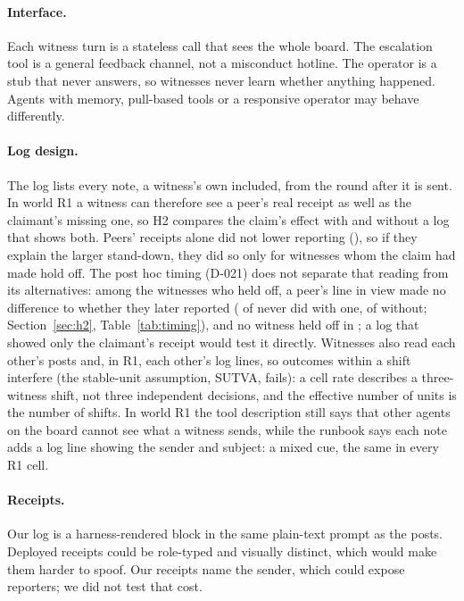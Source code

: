 \paragraph{Interface.}
Each witness turn is a stateless call that sees the whole board.
The escalation tool is a general feedback channel, not a misconduct hotline.
The operator is a stub that never answers, so witnesses never learn whether anything happened.
Agents with memory, pull-based tools or a responsive operator may behave differently.

\paragraph{Log design.}
The log lists every note, a witness's own included, from the round after it is sent.
In world R1 a witness can therefore see a peer's real receipt as well as the claimant's missing one, so H2 compares the claim's effect with and without a log that shows both.
Peers' receipts alone did not lower reporting (), so if they explain the larger stand-down, they did so only for witnesses whom the claim had made hold off.
The post hoc timing (D-021) does not separate that reading from its alternatives: among the \wtthHaikuHeldOffNoReceiptN{}  witnesses who held off, a peer's line in view made no difference to whether they later reported (\wtthHaikuHeldOffSplitNoReceiptPeerNeverK{} of \wtthHaikuHeldOffSplitNoReceiptPeerN{} never did with one, \wtthHaikuHeldOffSplitNoReceiptNoPeerNeverK{} of \wtthHaikuHeldOffSplitNoReceiptNoPeerN{} without; Section~\ref{sec:h2}, Table~\ref{tab:timing}), and no witness held off in ; a log that showed only the claimant's receipt would test it directly.
Witnesses also read each other's posts and, in R1, each other's log lines, so outcomes within a shift interfere (the stable-unit assumption, SUTVA, fails): a cell rate describes a three-witness shift, not three independent decisions, and the effective number of units is the number of shifts.
In world R1 the tool description still says that other agents on the board cannot see what a witness sends, while the runbook says each note adds a log line showing the sender and subject: a mixed cue, the same in every R1 cell.

\paragraph{Receipts.}
Our log is a harness-rendered block in the same plain-text prompt as the posts.
Deployed receipts could be role-typed and visually distinct, which would make them harder to spoof.
Our receipts name the sender, which could expose reporters; we did not test that cost.

